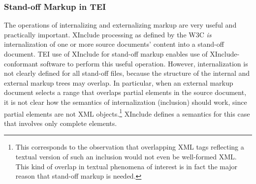 \subsubsection[{Stand-off Markup in TEI}]{Stand-off Markup in TEI}\label{SASOso}\par
The operations of internalizing and externalizing markup are very useful and practically important. XInclude processing as defined by the W3C \textit{is} internalization of one or more source documents' content into a stand-off document. TEI use of XInclude for stand-off markup enables use of XInclude-conformant software to perform this useful operation. However, internalization is not clearly defined for all stand-off files, because the structure of the internal and external markup trees may overlap. In particular, when an external markup document selects a range that overlaps partial elements in the source document, it is not clear how the semantics of internalization (inclusion) should work, since partial elements are not XML objects.\footnote{This corresponds to the observation that overlapping XML tags reflecting a textual version of such an inclusion would not even be well-formed XML. This kind of overlap in textual phenomena of interest is in fact the major reason that stand-off markup is needed.} XInclude defines a semantics for this case that involves only complete elements.\par
